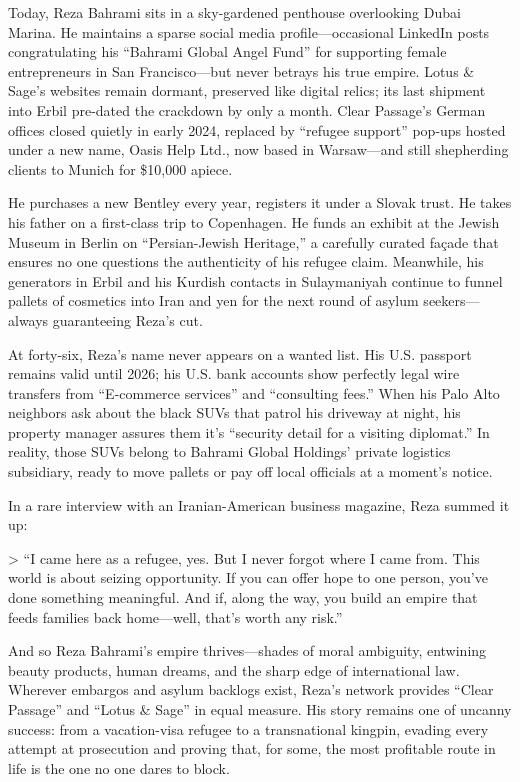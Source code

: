 Today, Reza Bahrami sits in a sky-gardened penthouse overlooking Dubai Marina. He maintains a sparse social media profile—occasional LinkedIn posts congratulating his “Bahrami Global Angel Fund” for supporting female entrepreneurs in San Francisco—but never betrays his true empire. Lotus \& Sage’s websites remain dormant, preserved like digital relics; its last shipment into Erbil pre-dated the crackdown by only a month. Clear Passage’s German offices closed quietly in early 2024, replaced by “refugee support” pop-ups hosted under a new name, Oasis Help Ltd., now based in Warsaw—and still shepherding clients to Munich for \$10,000 apiece.

He purchases a new Bentley every year, registers it under a Slovak trust. He takes his father on a first-class trip to Copenhagen. He funds an exhibit at the Jewish Museum in Berlin on “Persian-Jewish Heritage,” a carefully curated façade that ensures no one questions the authenticity of his refugee claim. Meanwhile, his generators in Erbil and his Kurdish contacts in Sulaymaniyah continue to funnel pallets of cosmetics into Iran and yen for the next round of asylum seekers—always guaranteeing Reza’s cut.

At forty-six, Reza’s name never appears on a wanted list. His U.S. passport remains valid until 2026; his U.S. bank accounts show perfectly legal wire transfers from “E-commerce services” and “consulting fees.” When his Palo Alto neighbors ask about the black SUVs that patrol his driveway at night, his property manager assures them it’s “security detail for a visiting diplomat.” In reality, those SUVs belong to Bahrami Global Holdings’ private logistics subsidiary, ready to move pallets or pay off local officials at a moment’s notice.

In a rare interview with an Iranian-American business magazine, Reza summed it up:

> “I came here as a refugee, yes. But I never forgot where I came from. This world is about seizing opportunity. If you can offer hope to one person, you’ve done something meaningful. And if, along the way, you build an empire that feeds families back home—well, that’s worth any risk.”

And so Reza Bahrami’s empire thrives—shades of moral ambiguity, entwining beauty products, human dreams, and the sharp edge of international law. Wherever embargos and asylum backlogs exist, Reza’s network provides “Clear Passage” and “Lotus \& Sage” in equal measure. His story remains one of uncanny success: from a vacation-visa refugee to a transnational kingpin, evading every attempt at prosecution and proving that, for some, the most profitable route in life is the one no one dares to block.

